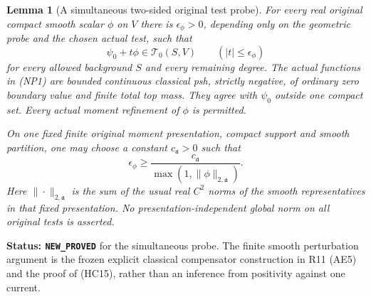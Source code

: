 \documentclass[11pt,a4paper]{article}
\numberwithin{equation}{section}
\newtheorem{lemma}[theorem]{Lemma}
\theoremstyle{definition}
\theoremstyle{remark}
\begin{document}
\begin{lemma}[A simultaneous two-sided original test probe]
\label{lem:r12-two-sided-geometric-probe}
For every real original compact smooth scalar $\phi$ on $V$
there is $\epsilon_\phi>0$, depending only on the geometric
probe and the chosen actual test, such that
\[
             \psi_0+t\phi\in\mathscr T_0(S,V)
                  \qquad(|t|\le\epsilon_\phi)
 \tag{NP1}
\]
for every allowed background $S$ and every remaining degree.
The actual functions in \textup{(NP1)} are bounded continuous
classical psh, strictly negative, of ordinary zero boundary
value and finite total top mass.  They agree with $\psi_0$
outside one compact set.  Every actual moment refinement of
$\phi$ is permitted.

On one fixed finite original moment presentation, compact
support and smooth partition, one may choose a constant
$c_{\mathfrak a}>0$ such that
\[
       \epsilon_\phi\ge
           \frac{c_{\mathfrak a}}{\max(1,\|\phi\|_{2,\mathfrak a})}.
 \tag{NP2}
\]
Here $\|\cdot\|_{2,\mathfrak a}$ is the sum of the
usual real $C^2$ norms of the smooth representatives in
that fixed presentation.  No presentation-independent
global norm on all original tests is asserted.
\end{lemma}

\noindent\textbf{Status: \texttt{NEW\_PROVED}} for the
simultaneous probe.  The finite smooth perturbation argument
is the frozen explicit classical compensator construction in
R11 \textup{(AE5)} and the proof of \textup{(HC15)}, rather
than an inference from positivity against one current.
\end{document}
